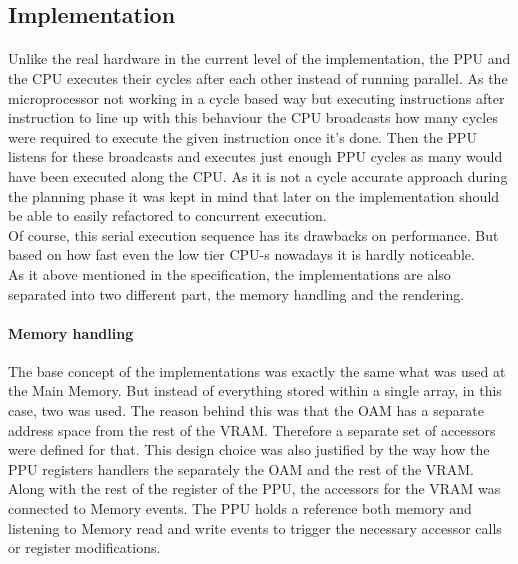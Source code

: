 \documentclass[]{report}
\begin{document}
\subsection{Implementation}
\paragraph{ }
Unlike the real hardware in the current level of the implementation, the PPU and the CPU executes their cycles after each other instead of running parallel. As the microprocessor not working in a cycle based way but executing instructions after instruction to line up with this behaviour the CPU broadcasts how many cycles were required to execute the given instruction once it's done. Then the PPU listens for these broadcasts and executes just enough PPU cycles as many would have been executed along the CPU. As it is not a cycle accurate approach during the planning phase it was kept in mind that later on the implementation should be able to easily refactored to concurrent execution.
\\
Of course, this serial execution sequence has its drawbacks on performance. But based on how fast even the low tier CPU-s nowadays it is hardly noticeable.
\\
As it above mentioned in the specification, the implementations are also separated into two different part, the memory handling and the rendering.

\paragraph{Memory handling}
The base concept of the implementations was exactly the same what was used at the Main Memory.
But instead of everything stored within a single array, in this case, two was used. The reason behind this was that the OAM has a separate address space from the rest of the VRAM. Therefore a separate set of accessors were defined for that. This design choice was also justified by the way how the PPU registers handlers the separately the OAM and the rest of the VRAM.
\\
Along with the rest of the register of the PPU, the accessors for the VRAM was connected to Memory events. The PPU holds a reference both memory and listening to Memory read and write events to trigger the necessary accessor calls or register modifications.
\end{document}
